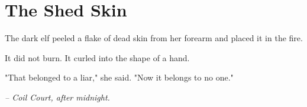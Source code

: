 \chapter*{The Shed Skin}

The dark elf peeled a flake of dead skin from her forearm and placed it in the fire.

It did not burn. It curled into the shape of a hand.

"That belonged to a liar," she said. "Now it belongs to no one."

\smallskip

\noindent \textit{-- Coil Court, after midnight.}

